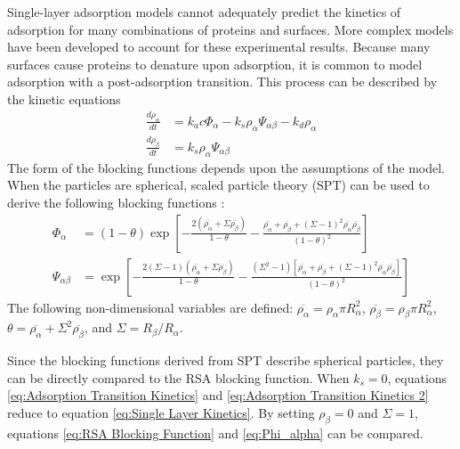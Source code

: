 Single-layer adsorption models cannot adequately predict the kinetics
of adsorption for many combinations of proteins and surfaces. More
complex models have been developed to account for these experimental
results. Because many surfaces cause proteins to denature upon adsorption,
it is common to model adsorption with a post-adsorption transition.
This process can be described by the kinetic equations\begin{align}
\frac{d\rho_{\alpha}}{dt} & =k_{a}c\Phi_{\alpha}-k_{s}\rho_{\alpha}\Psi_{\alpha\beta}-k_{d}\rho_{\alpha}\label{eq:Adsorption Transition Kinetics}\\
\frac{d\rho_{\beta}}{dt} & =k_{s}\rho_{\alpha}\Psi_{\alpha\beta}\label{eq:Adsorption Transition Kinetics 2}\end{align}
The form of the blocking functions depends upon the assumptions of
the model. When the particles are spherical, scaled particle theory
(SPT) can be used to derive the following blocking functions \cite{Brusatori1999}:
\begin{align}
\Phi_{\alpha} & =\left(1-\theta\right)\exp\left[-\frac{2\left(\overline{\rho_{\alpha}}+\Sigma\overline{\rho_{\beta}}\right)}{1-\theta}-\frac{\overline{\rho_{\alpha}}+\overline{\rho_{\beta}}+\left(\Sigma-1\right)^{2}\overline{\rho_{\alpha}}\overline{\rho_{\beta}}}{\left(1-\theta\right)^{2}}\right]\label{eq:Phi_alpha}\\
\Psi_{\alpha\beta} & =\exp\left[-\frac{2\left(\Sigma-1\right)\left(\overline{\rho_{\alpha}}+\Sigma\overline{\rho_{\beta}}\right)}{1-\theta}-\frac{\left(\Sigma^{2}-1\right)\left[\overline{\rho_{\alpha}}+\overline{\rho_{\beta}}+\left(\Sigma-1\right)^{2}\overline{\rho_{\alpha}}\overline{\rho_{\beta}}\right]}{\left(1-\theta\right)^{2}}\right]\label{eq:Psi_alpha_beta}\end{align}
The following non-dimensional variables are defined: $\overline{\rho_{\alpha}}=\rho_{\alpha}\pi R_{\alpha}^{2}$,
$\overline{\rho_{\beta}}=\rho_{\beta}\pi R_{\alpha}^{2}$, $\theta=\overline{\rho_{\alpha}}+\Sigma^{2}\overline{\rho_{\beta}}$,
and $\Sigma=R_{\beta}/R_{\alpha}$.

Since the blocking functions derived from SPT describe spherical particles,
they can be directly compared to the RSA blocking function. When $k_{s}=0$,
equations \ref{eq:Adsorption Transition Kinetics} and \ref{eq:Adsorption Transition Kinetics 2}
reduce to equation \ref{eq:Single Layer Kinetics}. By setting $\rho_{\beta}=0$
and $\Sigma=1$, equations \ref{eq:RSA Blocking Function} and \ref{eq:Phi_alpha}
can be compared.

